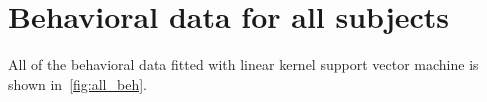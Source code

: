 \documentclass{article}
\begin{document}
\nocite{langley00}





\appendix
\section{Behavioral data for all subjects}
All of the behavioral data fitted with linear kernel support vector machine is shown in~\autoref{fig:all_beh}.
\end{document}
